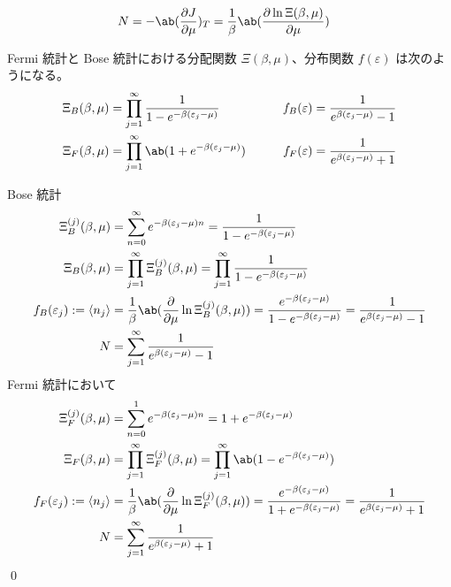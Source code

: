 \documentclass[uplatex,diffipdfmx,a4paper,11pt]{jlreq}
\makeatletter
\numberwithin{equation}{section}
\theoremstyle{definition}
\renewenvironment{proof}[1][\proofname]{\par
  \normalfont
  \topsep6\p@\@plus6\p@ \trivlist
  \item[\hskip\labelsep{\bfseries #1}\@addpunct{\bfseries}]\ignorespaces\quad\par
}{%
  \qed\endtrivlist\@endpefalse
}
\renewcommand\proofname{証明}
\makeatother
\begin{document}
\begin{align}
  N & = -\ab(\diffp{J}{\mu})_T = \frac{1}{\beta}\ab(\diffp{\ln\Xi(\beta,\mu)}{\mu})
\end{align}

\begin{theorem}[分配関数と分布関数]
  Fermi 統計と Bose 統計における分配関数 $\Xi(\beta,\mu)$、分布関数 $f(\varepsilon)$ は次のようになる。
  \begin{alignat}{3}
    \Xi_B(\beta, \mu) & = \prod_{j=1}^{\infty}\frac{1}{1 - e^{-\beta(\varepsilon_j - \mu)}} & \qquad f_B(\varepsilon) & = \frac{1}{e^{\beta(\varepsilon_j - \mu)} - 1} \\
    \Xi_F(\beta, \mu) & = \prod_{j=1}^{\infty}\ab(1 + e^{-\beta(\varepsilon_j - \mu)})      & \qquad f_F(\varepsilon) & = \frac{1}{e^{\beta(\varepsilon_j - \mu)} + 1}
  \end{alignat}
\end{theorem}
\begin{proof}
  Bose 統計
  \begin{align}
    \Xi_B^{(j)}(\beta, \mu)                  & = \sum_{n=0}^{\infty}e^{-\beta(\varepsilon_j - \mu)n} = \frac{1}{1 - e^{-\beta(\varepsilon_j - \mu)}}                                                                                     \\
    \Xi_B(\beta, \mu)                        & = \prod_{j=1}^{\infty}\Xi_B^{(j)}(\beta, \mu) = \prod_{j=1}^{\infty}\frac{1}{1 - e^{-\beta(\varepsilon_j - \mu)}}                                                                         \\
    f_B(\varepsilon_j) := \langle n_j\rangle & = \frac{1}{\beta}\ab(\diffp{}{\mu}\ln\Xi_B^{(j)}(\beta,\mu)) = \frac{e^{-\beta(\varepsilon_j - \mu)}}{1 - e^{-\beta(\varepsilon_j - \mu)}} = \frac{1}{e^{\beta(\varepsilon_j - \mu)} - 1} \\
    N                                        & = \sum_{j=1}^{\infty}\frac{1}{e^{\beta(\varepsilon_j - \mu)} - 1}
  \end{align}
  Fermi 統計において
  \begin{align}
    \Xi_F^{(j)}(\beta, \mu)                  & = \sum_{n=0}^{1}e^{-\beta(\varepsilon_j - \mu)n} = 1 + e^{-\beta(\varepsilon_j - \mu)}                                                                                                    \\
    \Xi_F(\beta, \mu)                        & = \prod_{j=1}^{\infty}\Xi_F^{(j)}(\beta, \mu) = \prod_{j=1}^{\infty}\ab(1 - e^{-\beta(\varepsilon_j - \mu)})                                                                              \\
    f_F(\varepsilon_j) := \langle n_j\rangle & = \frac{1}{\beta}\ab(\diffp{}{\mu}\ln\Xi_F^{(j)}(\beta,\mu)) = \frac{e^{-\beta(\varepsilon_j - \mu)}}{1 + e^{-\beta(\varepsilon_j - \mu)}} = \frac{1}{e^{\beta(\varepsilon_j - \mu)} + 1} \\
    N                                        & = \sum_{j=1}^{\infty}\frac{1}{e^{\beta(\varepsilon_j - \mu)} + 1}
  \end{align}
\end{proof}
\end{document}

